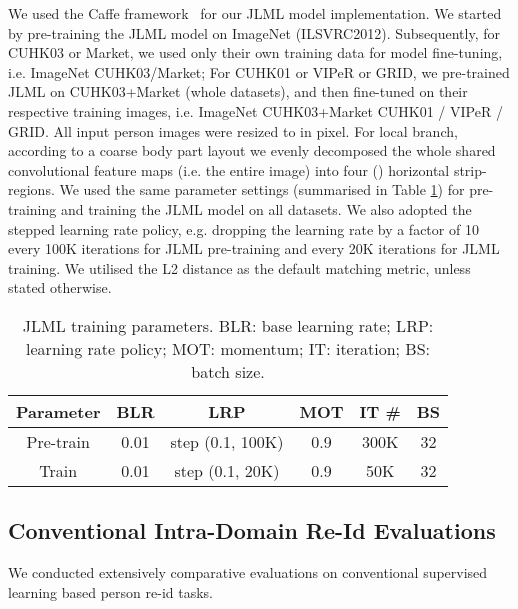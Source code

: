 \documentclass{article}
\begin{document}
\vspace{0.1cm}
We used the Caffe framework~\cite{jia2014caffe} for our JLML model implementation. 
We started by pre-training the JLML model on ImageNet (ILSVRC2012).
Subsequently, for CUHK03 or Market, we used only their own training data 
for model fine-tuning, i.e. ImageNet  CUHK03/Market;
For CUHK01 or VIPeR or GRID, we pre-trained JLML on CUHK03+Market (whole datasets),
and then fine-tuned on their respective training images, i.e.
ImageNet  CUHK03+Market  CUHK01 / VIPeR / GRID.
All input person images were resized to  in pixel.
For local branch, according to a coarse body part layout 
we evenly decomposed the whole shared convolutional feature maps (i.e. the entire image) 
into four () horizontal strip-regions. 
We used the same parameter settings (summarised in Table \ref{tab:param}) 
for pre-training and training the JLML model on all datasets.
We also adopted the stepped learning rate policy, 
e.g. dropping the learning rate by a factor of 10 every 100K iterations for JLML pre-training
and every 20K iterations for JLML training.
We utilised the L2 distance as the default matching metric, unless stated otherwise.

\begin{table} [!h]
	\centering
	\footnotesize
\renewcommand{\arraystretch}{1}
	\setlength{\tabcolsep}{0.2 cm}
	\vspace{-0.3cm}
	\caption{\footnotesize
		JLML training parameters. BLR: base learning rate; LRP: learning rate policy;
		MOT: momentum; IT: iteration; BS: batch size.
}
	\vskip 0pt \begin{tabular}{|c||c|c|c|c|c|}
		\hline
		Parameter 
		& BLR & LRP & MOT & IT \# & BS \\ \hline \hline
		Pre-train
		& 0.01 & step (0.1, 100K) & 0.9 & 300K & 32 \\ \hline
		Train
		& 0.01 & step (0.1, 20K) & 0.9 & 50K & 32 \\ 
		\hline
	\end{tabular}\label{tab:param}
	\vspace{-0.3cm}
\end{table}


\subsection{Conventional Intra-Domain Re-Id Evaluations}
\label{sec:eval_specific}
We conducted extensively comparative evaluations on conventional supervised learning based person re-id tasks.
\end{document}
